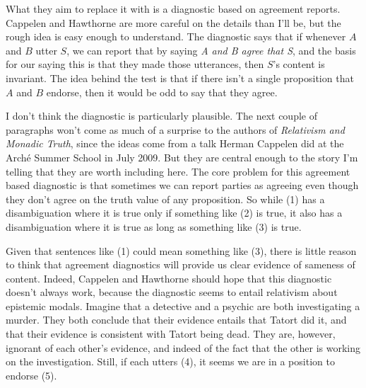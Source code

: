 What they aim to replace it with is a diagnostic based on agreement reports. Cappelen and Hawthorne are more careful on the details than I'll be, but the rough idea is easy enough to understand. The diagnostic says that if whenever $A$ and $B$ utter $S$, we can report that by saying \textit{A and B agree that S}, and the basis for our saying this is that they made those utterances, then $S$'s content is invariant. The idea behind the test is that if there isn't a single proposition that $A$ and $B$ endorse, then it would be odd to say that they agree.

I don't think the diagnostic is particularly plausible. The next couple of paragraphs won't come as much of a surprise to the authors of \textit{Relativism and Monadic Truth}, since the ideas come from a talk Herman Cappelen did at the Arch\'{e} Summer School in July 2009. But they are central enough to the story I'm telling that they are worth including here. The core problem for this agreement based diagnostic is that sometimes we can report parties as agreeing even though they don't agree on the truth value of any proposition. So while (1) has a disambiguation where it is true only if something like (2) is true, it also has a disambiguation where it is true as long as something like (3) is true.


\noindent Given that sentences like (1) could mean something like (3), there is little reason to think that agreement diagnostics will provide us clear evidence of sameness of content. Indeed, Cappelen and Hawthorne should hope that this diagnostic doesn't always work, because the diagnostic seems to entail relativism about epistemic modals. Imagine that a detective and a psychic are both investigating a murder. They both conclude that their evidence entails that Tatort did it, and that their evidence is consistent with Tatort being dead. They are, however, ignorant of each other's evidence, and indeed of the fact that the other is working on the investigation. Still, if each utters (4), it seems we are in a position to endorse (5).

